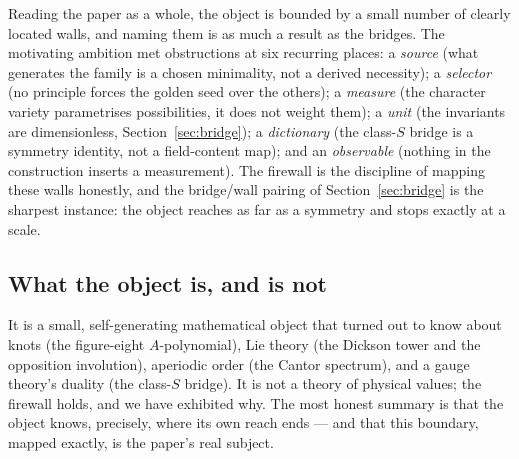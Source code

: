 Reading the paper as a whole, the object is bounded by a small number of clearly located
walls, and naming them is as much a result as the bridges. The motivating ambition met
obstructions at six recurring places: a \emph{source} (what generates the family is a
chosen minimality, not a derived necessity); a \emph{selector} (no principle forces the
golden seed over the others); a \emph{measure} (the character variety parametrises
possibilities, it does not weight them); a \emph{unit} (the invariants are dimensionless,
Section~\ref{sec:bridge}); a \emph{dictionary} (the class-$S$ bridge is a symmetry
identity, not a field-content map); and an \emph{observable} (nothing in the construction
inserts a measurement). The firewall is the discipline of mapping these walls honestly,
and the bridge/wall pairing of Section~\ref{sec:bridge} is the sharpest instance: the
object reaches as far as a symmetry and stops exactly at a scale.

\subsection{What the object is, and is not}

It is a small, self-generating mathematical object that turned out to know about knots
(the figure-eight $A$-polynomial), Lie theory (the Dickson tower and the opposition
involution), aperiodic order (the Cantor spectrum), and a gauge theory's duality (the
class-$S$ bridge). It is not a theory of physical values; the firewall holds, and we have
exhibited why. The most honest summary is that the object knows, precisely, where its own
reach ends --- and that this boundary, mapped exactly, is the paper's real subject.
